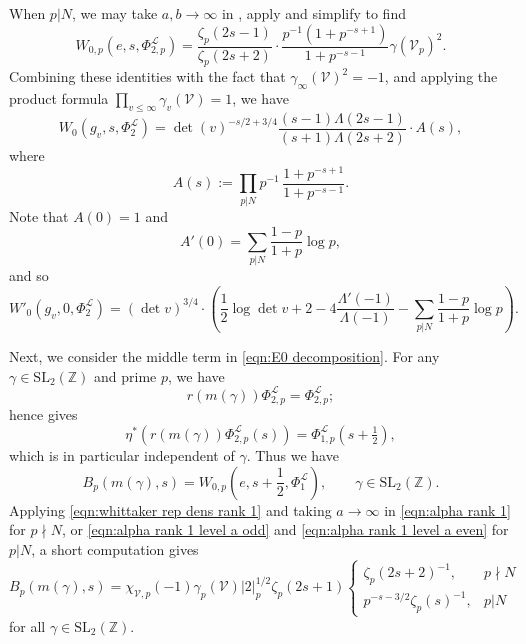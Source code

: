 \documentclass[reqno,oneside]{amsart}
\theoremstyle{plain}
\theoremstyle{remark}
\numberwithin{theorem}{section}
\newcommand{\bbZ}{\mathbb Z}
\newcommand{\calL}{\mathcal L}
\newcommand{\calV}{\mathcal V}
\begin{document}
	When $p | N$, we may take $a, b \to \infty$ in , apply  and simplify to find
	\begin{equation}
	W_{0,p}(e, s, \Phi^{\calL}_{2,p}) = \frac{ \zeta_{p}(2s -1)}{\zeta_{p}(2s + 2)} \cdot \frac{p^{-1}(1+p^{-s+1})}{1+p^{-s-1}} \gamma(\calV_p)^2.
	\end{equation}
	Combining these identities with the fact that $\gamma_{\infty}(\calV)^2 = -1$, and applying the product formula $\prod_{v \leq \infty} \gamma_v(\calV) = 1$, we have
	\begin{equation}
	W_0(g_v, s, \Phi^{\calL}_{2}) = \det(v)^{-s/2 + 3/4} \frac{(s-1)\Lambda(2s-1)}{(s+1)\Lambda(2s+2)} \cdot A(s),
	\end{equation}
	where
	\begin{equation}
	A(s) := \prod_{p|N} p^{-1} \,  \frac{1+p^{-s+1}}{1+p^{-s-1}}.
	\end{equation}
	Note that $A(0) = 1$ and
	\begin{equation}
	A'(0) = \sum_{p|N}  \frac{1-p}{1+p} \log p,
	\end{equation}
	and so
	\begin{equation}
	W'_0(g_v, 0, \Phi^{\calL}_2) = (\det v)^{3/4}  \cdot \left( \frac12 \log \det v + 2 - 4 \frac{\Lambda'(-1)}{\Lambda(-1)} - \sum_{p|N} \frac{1-p}{1+p} \log p \right).
	\end{equation}
	
	Next, we consider the middle term in \eqref{eqn:E0 decomposition}.
	For any $\gamma \in \mathrm{SL}_2(\bbZ)$ and prime $p$, we have
	\begin{equation}
	r(m(\gamma)) \Phi^{\calL}_{2,p} = \Phi^{\calL}_{2,p};
	\end{equation}
	hence  gives
	\begin{equation}
	\eta^* \left( r(m(\gamma)) \Phi^{\calL}_{2,p}(s) \right) = \Phi^{\calL}_{1,p}\left( s + \tfrac 12 \right),
	\end{equation}
	which is in particular independent of $\gamma$. Thus we have
	\begin{equation}
	B_p(m(\gamma), s) = W_{0,p}(e, s+\frac12, \Phi^{\calL}_1), \qquad \gamma\in \mathrm{SL}_2(\bbZ).
	\end{equation}
	Applying \eqref{eqn:whittaker rep dens rank 1} and taking $a \to \infty$ in  \eqref{eqn:alpha rank 1} for $p\nmid N$, or  \eqref{eqn:alpha rank 1 level  a odd} and \eqref{eqn:alpha rank 1 level a even} for $p|N$, a short computation gives
	\begin{equation}
	B_p(m(\gamma), s) =
	\chi_{\calV,p}(-1) \gamma_p(\calV) |2|_p^{1/2} \zeta_p(2s+1)
	\begin{cases}
	\zeta_p(2s+2)^{-1}, & p \nmid N \\
	p^{-s-3/2}\zeta_p(s)^{-1}, & p | N	
	\end{cases}
	\end{equation}
	for all $\gamma \in \mathrm{SL}_2(\bbZ)$.
	
\end{document}
